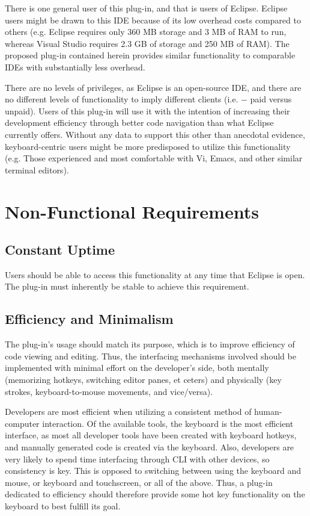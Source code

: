 \documentclass[]{report}
\begin{document}
		There is one general user of this plug-in, and that is users of Eclipse.  Eclipse users might be drawn to this IDE because of its low overhead costs compared to others (e.g. Eclipse requires only 360 MB storage and 3 MB of RAM to run, whereas Visual Studio requires 2.3 GB of storage and 250 MB of RAM).  The proposed plug-in contained herein provides similar functionality to comparable IDEs with substantially less overhead.
		
		There are no levels of privileges, as Eclipse is an open-source IDE, and there are no different levels of functionality to imply different clients (i.e. $-$ paid versus unpaid). Users of this plug-in will use it with the intention of increasing their development efficiency through better code navigation than what Eclipse currently offers.  Without any data to support this other than anecdotal evidence, keyboard-centric users might be more predisposed to utilize this functionality (e.g. Those experienced and most comfortable with Vi, Emacs, and other similar terminal editors).

\chapter{Non-Functional Requirements}

	\section{Constant Uptime}
	
		Users should be able to access this functionality at any time that Eclipse is open.  The plug-in must inherently be stable to achieve this requirement.
	
	\section{Efficiency and Minimalism}
	
		The plug-in's usage should match its purpose, which is to improve efficiency of code viewing and editing.  Thus, the interfacing mechanisms involved should be implemented with minimal effort on the developer's side, both mentally (memorizing hotkeys, switching editor panes, et ceters) and physically (key strokes, keyboard-to-mouse movements, and vice/versa).
		
		Developers are most efficient when utilizing a consistent method of human-computer interaction.  Of the available tools, the keyboard is the most efficient interface, as most all developer tools have been created with keyboard hotkeys, and manually generated code is created via the keyboard.  Also, developers are very likely to spend time interfacing through CLI with other devices, so consistency is key.  This is opposed to switching between using the keyboard and mouse, or keyboard and touchscreen, or all of the above.  Thus, a plug-in dedicated to efficiency should therefore provide some hot key functionality on the keyboard to best fulfill its goal.
	
\end{document}
